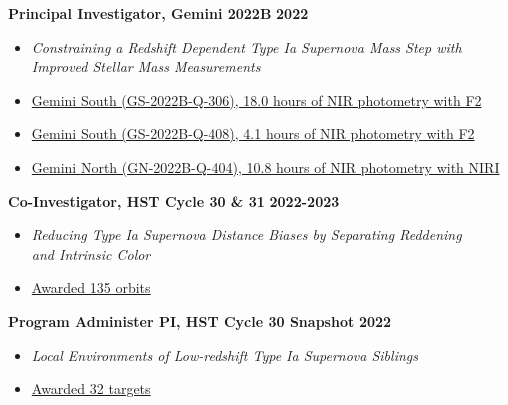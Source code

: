 \documentclass[margin]{res}
\begin{document}
\begin{resume}
{\bf Principal Investigator, Gemini 2022B} \hfill \textbf{2022} 
\begin{itemize} \itemsep -2pt %
     \item[] \textit{Constraining a Redshift Dependent Type Ia Supernova Mass Step with \\Improved Stellar Mass Measurements}
     \item[]\href{http://www.gemini.edu/observing/schedules-and-queue/2022b-gs-queue-band-1-3}{Gemini South (GS-2022B-Q-306), 18.0 hours of NIR photometry with F2}
     \item[]\href{http://www.gemini.edu/observing/schedules-and-queue/2022b-gs-queue-band-4}{Gemini South (GS-2022B-Q-408), 4.1 hours of NIR photometry with F2}
     \item[]\href{http://www.gemini.edu/observing/schedules-and-queue/2022b-gn-queue-band-4}{Gemini North (GN-2022B-Q-404), 10.8 hours of NIR photometry with NIRI}
     \end{itemize} \vspace{-12pt}

{\bf Co-Investigator, HST Cycle 30 \& 31} \hfill {\bf 2022-2023}
\begin{itemize} \itemsep -2pt %
     \item[] \textit{Reducing Type Ia Supernova Distance Biases by Separating Reddening\\and Intrinsic Color}
     \item[] \href{https://archive.stsci.edu/proposal_search.php?id=17128&mission=hst}{Awarded 135 orbits}
     \end{itemize} \vspace{-12pt}
     
{\bf Program Administer PI, HST Cycle 30 Snapshot} \hfill {\bf 2022}
\begin{itemize} \itemsep -2pt %
     \item[] \textit{Local Environments of Low-redshift Type Ia Supernova Siblings}
     \item[] \href{https://archive.stsci.edu/proposal_search.php?id=17194&mission=hst}{Awarded 32 targets}
     \end{itemize} \vspace{-12pt}



\end{resume}
\end{document}
